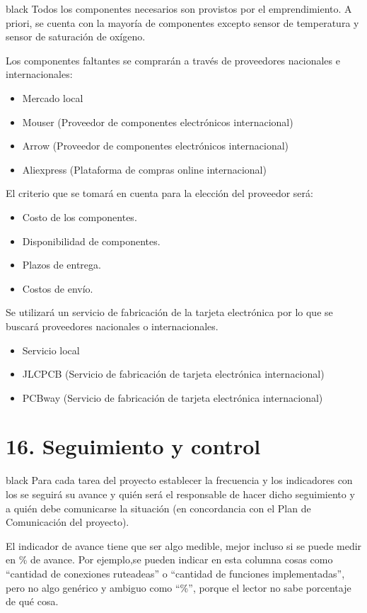 \documentclass[11pt]{charter}
\begin{document}
\begin{consigna}{black}
Todos los componentes necesarios son provistos por el emprendimiento. A priori, se cuenta con la mayoría de componentes excepto sensor de temperatura y sensor de saturación de oxígeno.

Los componentes faltantes se comprarán a través de proveedores nacionales e internacionales:
\begin{itemize} 
\item Mercado local
\item Mouser (Proveedor de componentes electrónicos internacional)
\item Arrow (Proveedor de componentes electrónicos internacional)
\item Aliexpress (Plataforma de compras online internacional)
\end{itemize}

El criterio que se tomará en cuenta para la elección del proveedor será:
\begin{itemize} 
\item Costo de los componentes.
\item Disponibilidad de componentes.
\item Plazos de entrega.
\item Costos de envío.
\end{itemize}

Se utilizará un servicio de fabricación de la tarjeta electrónica por lo que se buscará proveedores nacionales o internacionales.
\begin{itemize} 
\item Servicio local 
\item JLCPCB (Servicio de fabricación de tarjeta electrónica internacional)
\item PCBway (Servicio de fabricación de tarjeta electrónica internacional)
\end{itemize}

\end{consigna}

\section{16. Seguimiento y control}
\label{sec:seguimiento}

\begin{consigna}{black}
Para cada tarea del proyecto establecer la frecuencia y los indicadores con los se seguirá su avance y quién será el responsable de hacer dicho seguimiento y a quién debe comunicarse la situación (en concordancia con el Plan de Comunicación del proyecto).

El indicador de avance tiene que ser algo medible, mejor incluso si se puede medir en \% de avance. Por ejemplo,se pueden indicar en esta columna cosas como ``cantidad de conexiones ruteadeas'' o ``cantidad de funciones implementadas'', pero no algo genérico y ambiguo como ``\%'', porque el lector no sabe porcentaje de qué cosa.

\end{consigna}
\end{document}
